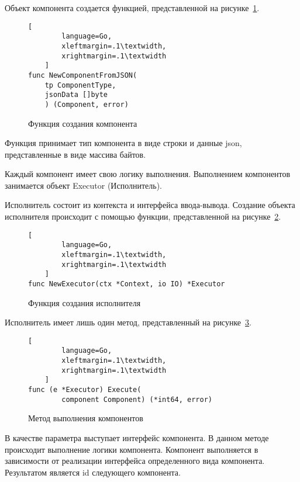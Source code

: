 Объект компонента создается функцией, представленной на рисунке~\ref{f:new-component}.

\begin{figure}[ht]
	\centering
	\vspace{\toppaddingoffigure}
	\begin{lstlisting}[
        language=Go,
        xleftmargin=.1\textwidth,
        xrightmargin=.1\textwidth
    ]
func NewComponentFromJSON(
    tp ComponentType, 
    jsonData []byte
    ) (Component, error)
    \end{lstlisting}
	\caption{Функция создания компонента}
	\label{f:new-component}
\end{figure}

Функция принимает тип компонента в виде строки и данные json,
представленные в виде массива байтов.

Каждый компонент имеет свою логику выполнения. Выполнением
компонентов занимается объект Executor (Исполнитель).

Исполнитель состоит из контекста и интерфейса ввода-вывода.
Создание объекта исполнителя происходит с помощью функции,
представленной на рисунке~\ref{f:new-executor}.


\begin{figure}[ht]
	\centering
	\vspace{\toppaddingoffigure}
	\begin{lstlisting}[
        language=Go,
        xleftmargin=.1\textwidth,
        xrightmargin=.1\textwidth
    ]
func NewExecutor(ctx *Context, io IO) *Executor 
    \end{lstlisting}
	\caption{Функция создания исполнителя}
	\label{f:new-executor}
\end{figure}

Исполнитель имеет лишь один метод, представленный на рисунке~\ref{f:execute}.


\begin{figure}[ht]
	\centering
	\vspace{\toppaddingoffigure}
	\begin{lstlisting}[
        language=Go,
        xleftmargin=.1\textwidth,
        xrightmargin=.1\textwidth
    ]
func (e *Executor) Execute(
        component Component) (*int64, error)
    \end{lstlisting}
	\caption{Метод выполнения компонентов}
	\label{f:execute}
\end{figure}


В качестве параметра выступает интерфейс компонента. В данном
методе происходит выполнение логики компонента. Компонент выполняется
в зависимости от реализации интерфейса определенного вида компонента.
Результатом является id следующего компонента.

